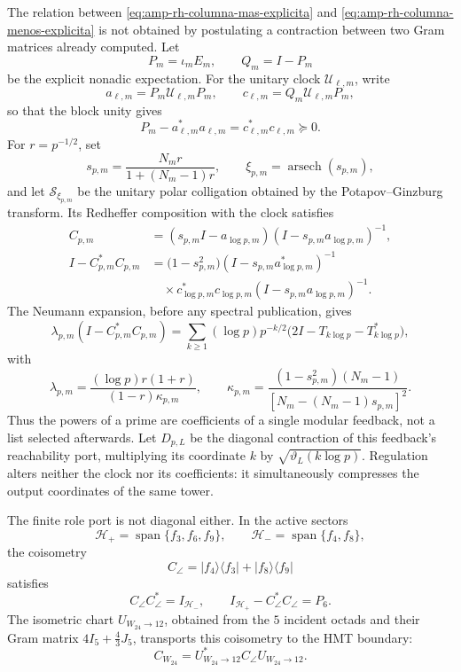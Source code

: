 The relation between \eqref{eq:amp-rh-columna-mas-explicita} and \eqref{eq:amp-rh-columna-menos-explicita} is not obtained by postulating a contraction between two Gram matrices already computed. Let
\[
 P_m=\iota_mE_m,\qquad Q_m=I-P_m
\]
be the explicit nonadic expectation. For the unitary clock \(\mathscr U_{\ell,m}\), write
\[
 a_{\ell,m}=P_m\mathscr U_{\ell,m}P_m,\qquad
 c_{\ell,m}=Q_m\mathscr U_{\ell,m}P_m ,
\]
so that the block unity gives
\begin{equation}\label{eq:amp-rh-defecto-schwarz-reloj}
 P_m-a_{\ell,m}^*a_{\ell,m}
 =c_{\ell,m}^*c_{\ell,m}\succeq0.
\end{equation}
For \(r=p^{-1/2}\), set
\[
 s_{p,m}=\frac{N_mr}{1+(N_m-1)r},
 \qquad \xi_{p,m}=\operatorname{arsech}(s_{p,m}),
\]
and let \(\mathscr S_{\xi_{p,m}}\) be the unitary polar colligation obtained by the Potapov--Ginzburg transform. Its Redheffer composition with the clock satisfies
\begin{align}
 C_{p,m}&=(s_{p,m}I-a_{\log p,m})
          (I-s_{p,m}a_{\log p,m})^{-1},\nonumber\\
 I-C_{p,m}^*C_{p,m}
 &=\bigl(1-s_{p,m}^2\bigr)
   (I-s_{p,m}a_{\log p,m}^*)^{-1}\nonumber\\
 &\quad{}\times c_{\log p,m}^*c_{\log p,m}
   (I-s_{p,m}a_{\log p,m})^{-1}.
   \label{eq:amp-rh-redheffer-defecto}
\end{align}
The Neumann expansion, before any spectral publication, gives
\begin{equation}\label{eq:amp-rh-torre-prima-explicita}
 \lambda_{p,m}(I-C_{p,m}^*C_{p,m})
 =\sum_{k\geq1}(\log p)p^{-k/2}
  \bigl(2I-T_{k\log p}-T_{k\log p}^*\bigr),
\end{equation}
with
\[
 \lambda_{p,m}
 =\frac{(\log p)r(1+r)}
 {(1-r)\kappa_{p,m}},
 \qquad
 \kappa_{p,m}
 =\frac{(1-s_{p,m}^2)(N_m-1)}
 {[N_m-(N_m-1)s_{p,m}]^2}.
\]
Thus the powers of a prime are coefficients of a single modular feedback, not a list selected afterwards. Let \(D_{p,L}\) be the diagonal contraction of this feedback's reachability port, multiplying its coordinate \(k\) by \(\sqrt{\vartheta_L(k\log p)}\). Regulation alters neither the clock nor its coefficients: it simultaneously compresses the output coordinates of the same tower.

The finite role port is not diagonal either. In the active sectors
\[
 \mathcal H_+
 =\operatorname{span}\{f_3,f_6,f_9\},\qquad
 \mathcal H_-=\operatorname{span}\{f_4,f_8\},
\]
the coisometry
\begin{equation}\label{eq:amp-rh-acoplamiento-angular}
 C_\angle
 =|f_4\rangle\langle f_3|
  +|f_8\rangle\langle f_9|
\end{equation}
satisfies
\[
 C_\angle C_\angle^*=I_{\mathcal H_-},\qquad
 I_{\mathcal H_+}-C_\angle^*C_\angle=P_6.
\]
The isometric chart \(U_{W_{24}\to12}\), obtained from the \(5\) incident octads and their Gram matrix \(4I_5+\frac43J_5\), transports this coisometry to the HMT boundary:
\[
 C_{W_{24}}
 =U_{W_{24}\to12}^*C_\angle U_{W_{24}\to12}.
\]

